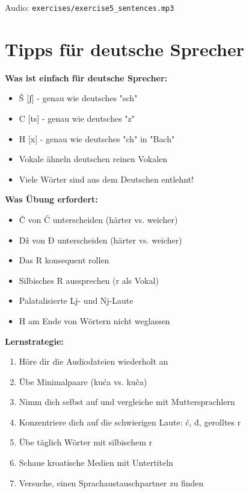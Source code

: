 Audio: \texttt{exercises/exercise5\_sentences.mp3}

\section{Tipps für deutsche Sprecher}

\begin{tcolorbox}[colback=lightblue!20, colframe=croatianblue, title=\textbf{Spezielle Tipps}]

\textbf{Was ist einfach für deutsche Sprecher:}
\begin{itemize}
    \item Š [ʃ] - genau wie deutsches "sch"
    \item C [ts] - genau wie deutsches "z"
    \item H [x] - genau wie deutsches "ch" in "Bach"
    \item Vokale ähneln deutschen reinen Vokalen
    \item Viele Wörter sind aus dem Deutschen entlehnt!
\end{itemize}

\textbf{Was Übung erfordert:}
\begin{itemize}
    \item Č von Ć unterscheiden (härter vs. weicher)
    \item Dž von Đ unterscheiden (härter vs. weicher)
    \item Das R konsequent rollen
    \item Silbisches R aussprechen (r als Vokal)
    \item Palatalisierte Lj- und Nj-Laute
    \item H am Ende von Wörtern nicht weglassen
\end{itemize}

\textbf{Lernstrategie:}
\begin{enumerate}
    \item Höre dir die Audiodateien wiederholt an
    \item Übe Minimalpaare (kuća vs. kuča)
    \item Nimm dich selbst auf und vergleiche mit Muttersprachlern
    \item Konzentriere dich auf die schwierigen Laute: ć, đ, gerolltes r
    \item Übe täglich Wörter mit silbischem r
    \item Schaue kroatische Medien mit Untertiteln
    \item Versuche, einen Sprachaustauschpartner zu finden
\end{enumerate}

\end{tcolorbox}

